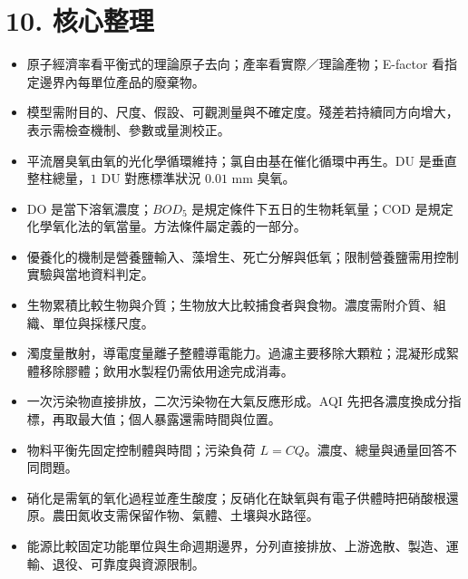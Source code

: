 \documentclass[11pt,a4paper]{article}
\providecommand{\tightlist}{%
  \setlength{\itemsep}{0pt}\setlength{\parskip}{0pt}}
\begin{document}
\section{10. 核心整理}\label{ux6838ux5fc3ux6574ux7406}

\begin{itemize}
\tightlist
\item
  原子經濟率看平衡式的理論原子去向；產率看實際／理論產物；E-factor 看指定邊界內每單位產品的廢棄物。
\item
  模型需附目的、尺度、假設、可觀測量與不確定度。殘差若持續同方向增大，表示需檢查機制、參數或量測校正。
\item
  平流層臭氧由氧的光化學循環維持；氯自由基在催化循環中再生。DU 是垂直整柱總量，\(1\) DU 對應標準狀況 \(0.01\) mm 臭氧。
\item
  DO 是當下溶氧濃度；\(BOD_5\) 是規定條件下五日的生物耗氧量；COD 是規定化學氧化法的氧當量。方法條件屬定義的一部分。
\item
  優養化的機制是營養鹽輸入、藻增生、死亡分解與低氧；限制營養鹽需用控制實驗與當地資料判定。
\item
  生物累積比較生物與介質；生物放大比較捕食者與食物。濃度需附介質、組織、單位與採樣尺度。
\item
  濁度量散射，導電度量離子整體導電能力。過濾主要移除大顆粒；混凝形成絮體移除膠體；飲用水製程仍需依用途完成消毒。
\item
  一次污染物直接排放，二次污染物在大氣反應形成。AQI 先把各濃度換成分指標，再取最大值；個人暴露還需時間與位置。
\item
  物料平衡先固定控制體與時間；污染負荷 \(L=CQ\)。濃度、總量與通量回答不同問題。
\item
  硝化是需氧的氧化過程並產生酸度；反硝化在缺氧與有電子供體時把硝酸根還原。農田氮收支需保留作物、氣體、土壤與水路徑。
\item
  能源比較固定功能單位與生命週期邊界，分列直接排放、上游逸散、製造、運輸、退役、可靠度與資源限制。
\end{itemize}
\end{document}
